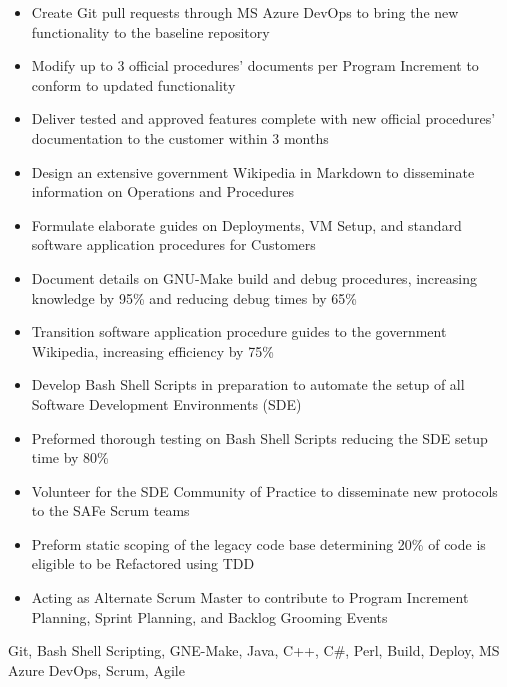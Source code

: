 \begin{experiences}
{\begin{itemize}
            \item Create Git pull requests through MS Azure DevOps to bring the new functionality to the baseline repository
            \item Modify up to 3 official procedures' documents per Program Increment to conform to updated functionality
            \item Deliver tested and approved features complete with new official procedures' documentation to the customer within 3 months
            \item Design an extensive government Wikipedia in Markdown to disseminate information on Operations and Procedures
            \item Formulate elaborate guides on Deployments, VM Setup, and standard software application procedures for Customers
            \item Document details on GNU-Make build and debug procedures, increasing knowledge by 95\% and reducing debug times by 65\%
            \item Transition software application procedure guides to the government Wikipedia, increasing efficiency by 75\% 
            \item Develop Bash Shell Scripts in preparation to automate the setup of all Software Development Environments (SDE)
            \item Preformed thorough testing on Bash Shell Scripts reducing the SDE setup time by 80\%
            \item Volunteer for the SDE Community of Practice to disseminate new protocols to the SAFe Scrum teams 
            \item Preform static scoping of the legacy code base determining 20\% of code is eligible to be Refactored using TDD
            \item Acting as Alternate Scrum Master to contribute to Program Increment Planning, Sprint Planning, and Backlog Grooming Events
      \end{itemize}
        }
        {Git, Bash Shell Scripting, GNE-Make, Java, C++, C\#, Perl, Build, Deploy, MS Azure DevOps, Scrum, Agile}
  \emptySeparator
  

\end{experiences}
